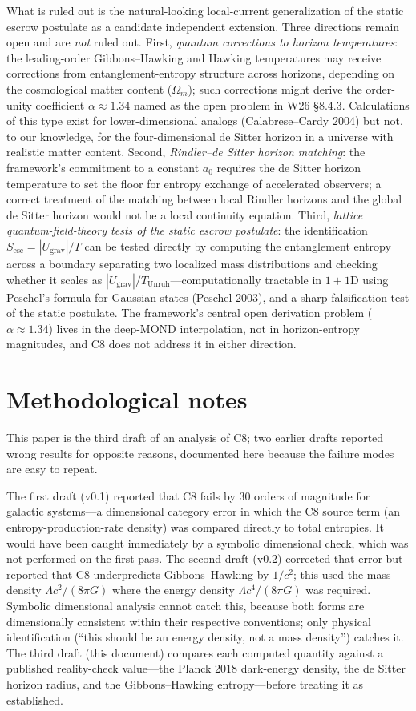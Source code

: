 \documentclass[11pt]{article}
\newcommand{\Sesc}{S_{\mathrm{esc}}}
\begin{document}
What is ruled out is the natural-looking local-current generalization of the static escrow postulate
as a candidate independent extension. Three directions remain open and are \emph{not} ruled out. First, \emph{quantum corrections to horizon temperatures}: the leading-order Gibbons--Hawking and Hawking temperatures may receive corrections from entanglement-entropy structure across horizons, depending on the cosmological matter content ($\Omega_m$); such corrections might derive the order-unity coefficient $\alpha \approx 1.34$ named as the open problem in W26 \S8.4.3. Calculations of this type exist for lower-dimensional analogs (Calabrese--Cardy 2004) but not, to our knowledge, for the four-dimensional de Sitter horizon in a universe with realistic matter content. Second, \emph{Rindler--de Sitter horizon matching}: the framework's commitment to a constant $a_0$ requires the de Sitter horizon temperature to set the floor for entropy exchange of accelerated observers; a correct treatment of the matching between local Rindler horizons and the global de Sitter horizon would not be a local continuity equation. Third, \emph{lattice quantum-field-theory tests of the static escrow postulate}: the identification $\Sesc = |U_{\mathrm{grav}}|/T$ can be tested directly by computing the entanglement entropy across a boundary separating two localized mass distributions and checking whether it scales as $|U_{\mathrm{grav}}|/T_{\mathrm{Unruh}}$---computationally tractable in $1{+}1$D using Peschel's formula for Gaussian states (Peschel 2003), and a sharp falsification test of the static postulate. The
framework's central open derivation problem ($\alpha \approx 1.34$) lives in the deep-MOND
interpolation, not in horizon-entropy magnitudes, and C8 does not address it in either direction.

\section{Methodological notes}

This paper is the third draft of an analysis of C8; two earlier drafts reported wrong results for
opposite reasons, documented here because the failure modes are easy to repeat.

The first draft (v0.1) reported that C8 fails by 30 orders of magnitude for galactic systems---a
dimensional category error in which the C8 source term (an entropy-production-rate density) was
compared directly to total entropies. It would have been caught immediately by a symbolic dimensional
check, which was not performed on the first pass. The second draft (v0.2) corrected that error but
reported that C8 underpredicts Gibbons--Hawking by $1/c^{2}$; this used the mass density
$\Lambda c^{2}/(8\pi G)$ where the energy density $\Lambda c^{4}/(8\pi G)$ was required. Symbolic
dimensional analysis cannot catch this, because both forms are dimensionally consistent within their
respective conventions; only physical identification (``this should be an energy density, not a mass
density'') catches it. The third draft (this document) compares each computed quantity against a
published reality-check value---the Planck 2018 dark-energy density, the de Sitter horizon radius, and
the Gibbons--Hawking entropy---before treating it as established.
\end{document}
